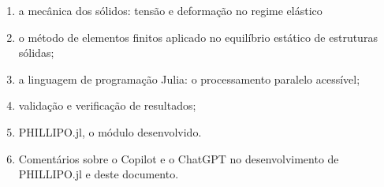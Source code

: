 \begin{enumerate}
    \item a mecânica dos sólidos: tensão e deformação no regime elástico
    \item o método de elementos finitos aplicado no equilíbrio estático de estruturas sólidas;
    \item a linguagem de programação Julia: o processamento paralelo acessível;
    \item validação e verificação de resultados;
    \item PHILLIPO.jl, o módulo desenvolvido.
    \item Comentários sobre o Copilot e o ChatGPT no desenvolvimento de PHILLIPO.jl e deste documento.
\end{enumerate}
